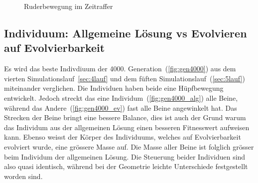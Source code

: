 \begin{figure}[H]
        \caption{Ruderbewegung im Zeitraffer\label{fig:ruder}}

      \end{figure}

    \subsection{Individuum: Allgemeine Lösung vs Evolvieren auf Evolvierbarkeit}

      Es wird das beste Indivdiuum der 4000. Generation~(\vref{fig:gen4000}) aus dem vierten Simulationslauf~\vref{sec:4lauf}
      und dem füften Simulationslauf~(\vref{sec:5lauf}) miteinander verglichen.
      Die Individuen haben beide eine Hüpfbewegung entwickelt.
      Jedoch streckt das eine Individum~(\vref{fig:gen4000_alg}) alle Beine,
      während das Andere~(\vref{fig:gen4000_ev}) fast alle Beine angewinkelt hat.
      Das Strecken der Beine bringt eine bessere Balance,
      dies ist auch der Grund warum das Individum aus der allgemeinen Lösung einen besseren Fitnesswert aufweisen kann.
      Ebenso weisst der Körper des Individuums, welches auf Evolvierbarkeit evolviert wurde, eine grössere Masse auf.
      Die Masse aller Beine ist folglich grösser beim Individum der allgemeinen Lösung.
      Die Steuerung beider Individuen sind also quasi identisch,
      während bei der Geometrie leichte Unterschiede festgestellt worden sind.

